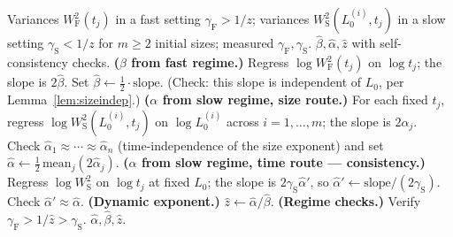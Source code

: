 \documentclass{amsart}
\theoremstyle{definition}
\begin{document}
\begin{algorithm}[H]
\caption{Unambiguous extraction of $\alpha,\beta,z$ from both regimes}
\begin{algorithmic}[1]
\Require Variances $W^2_{\mathrm F}(t_j)$ in a fast setting $\gamma_{\mathrm F}>1/z$;
  variances $W^2_{\mathrm S}(L_0^{(i)},t_j)$ in a slow setting
  $\gamma_{\mathrm S}<1/z$ for $m\ge2$ initial sizes; measured
  $\gamma_{\mathrm F},\gamma_{\mathrm S}$.
\Ensure $\hat\beta,\hat\alpha,\hat z$ with self-consistency checks.
\State \textbf{($\beta$ from fast regime.)} Regress
  $\log W^2_{\mathrm F}(t_j)$ on $\log t_j$; the slope is $2\hat\beta$. Set
  $\hat\beta\gets\tfrac12\cdot\mathrm{slope}$. (Check: this slope is independent of
  $L_0$, per Lemma~\ref{lem:sizeindep}.)
\State \textbf{($\alpha$ from slow regime, size route.)} For each fixed $t_j$,
  regress $\log W^2_{\mathrm S}(L_0^{(i)},t_j)$ on $\log L_0^{(i)}$ across
  $i=1,\dots,m$; the slope is $2\hat\alpha_j$. Check
  $\hat\alpha_1\approx\cdots\approx\hat\alpha_n$ (time-independence of the size
  exponent) and set $\hat\alpha\gets\tfrac12\,\mathrm{mean}_j(2\hat\alpha_j)$.
\State \textbf{($\alpha$ from slow regime, time route — consistency.)} Regress
  $\log W^2_{\mathrm S}$ on $\log t_j$ at fixed $L_0$; the slope is
  $2\gamma_{\mathrm S}\hat\alpha'$, so $\hat\alpha'\gets\mathrm{slope}/(2\gamma_{\mathrm S})$.
  Check $\hat\alpha'\approx\hat\alpha$.
\State \textbf{(Dynamic exponent.)} $\hat z\gets\hat\alpha/\hat\beta$.
\State \textbf{(Regime checks.)} Verify $\gamma_{\mathrm F}>1/\hat z>\gamma_{\mathrm S}$.
\State \Return $\hat\alpha,\hat\beta,\hat z$.
\end{algorithmic}
\end{algorithm}
\end{document}

